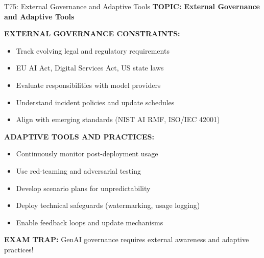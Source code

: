 \documentclass[8pt]{beamer}
\begin{document}
	\begin{frame}{T75: External Governance and Adaptive Tools}
		\fontsize{6.5}{7.5}\selectfont
		\textbf{TOPIC: External Governance and Adaptive Tools}
		
		\vspace{0.1cm}
		\textbf{EXTERNAL GOVERNANCE CONSTRAINTS:}
		\begin{itemize}
			\item Track evolving legal and regulatory requirements
			\item EU AI Act, Digital Services Act, US state laws
			\item Evaluate responsibilities with model providers
			\item Understand incident policies and update schedules
			\item Align with emerging standards (NIST AI RMF, ISO/IEC 42001)
		\end{itemize}
		
		\vspace{0.1cm}
		\textbf{ADAPTIVE TOOLS AND PRACTICES:}
		\begin{itemize}
			\item Continuously monitor post-deployment usage
			\item Use red-teaming and adversarial testing
			\item Develop scenario plans for unpredictability
			\item Deploy technical safeguards (watermarking, usage logging)
			\item Enable feedback loops and update mechanisms
		\end{itemize}
		
		\textcolor{myred}{\textbf{EXAM TRAP:}} GenAI governance requires \textcolor{myblue}{external awareness and adaptive practices}!
	\end{frame}
	
	
\end{document}
